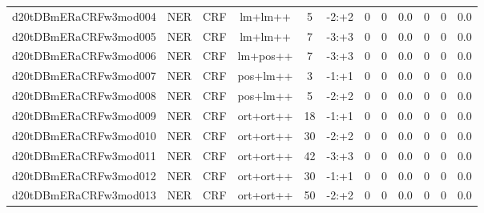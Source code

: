 \documentclass[a4paper]{article}
\begin{document}
\begin{landscape}
\begin{center}
\begin{tabular}{ |c|c|c|c|c|c|c|c|c|c|c|c|}
 
 	
 	\small{ d20tDBmERaCRFw3mod004 } & \small{ NER} & \small{  CRF }  & lm+lm++  &  5 &  \small{  -2:+2 }  &  0 & 0 & 0.0  &  0 & 0 & 0.0 \\
 	

 
 	
 	\small{ d20tDBmERaCRFw3mod005 } & \small{ NER} & \small{  CRF }  & lm+lm++  &  7 &  \small{  -3:+3 }  &  0 & 0 & 0.0  &  0 & 0 & 0.0 \\
 	

 
 	
 	\small{ d20tDBmERaCRFw3mod006 } & \small{ NER} & \small{  CRF }  & lm+pos++  &  7 &  \small{  -3:+3 }  &  0 & 0 & 0.0  &  0 & 0 & 0.0 \\
 	

 
 	
 	\small{ d20tDBmERaCRFw3mod007 } & \small{ NER} & \small{  CRF }  & pos+lm++  &  3 &  \small{  -1:+1 }  &  0 & 0 & 0.0  &  0 & 0 & 0.0 \\
 	

 
 	
 	\small{ d20tDBmERaCRFw3mod008 } & \small{ NER} & \small{  CRF }  & pos+lm++  &  5 &  \small{  -2:+2 }  &  0 & 0 & 0.0  &  0 & 0 & 0.0 \\
 	

 
 	
 	\small{ d20tDBmERaCRFw3mod009 } & \small{ NER} & \small{  CRF }  & ort+ort++  &  18 &  \small{  -1:+1 }  &  0 & 0 & 0.0  &  0 & 0 & 0.0 \\
 	

 
 	
 	\small{ d20tDBmERaCRFw3mod010 } & \small{ NER} & \small{  CRF }  & ort+ort++  &  30 &  \small{  -2:+2 }  &  0 & 0 & 0.0  &  0 & 0 & 0.0 \\
 	

 
 	
 	\small{ d20tDBmERaCRFw3mod011 } & \small{ NER} & \small{  CRF }  & ort+ort++  &  42 &  \small{  -3:+3 }  &  0 & 0 & 0.0  &  0 & 0 & 0.0 \\
 	

 
 	
 	\small{ d20tDBmERaCRFw3mod012 } & \small{ NER} & \small{  CRF }  & ort+ort++  &  30 &  \small{  -1:+1 }  &  0 & 0 & 0.0  &  0 & 0 & 0.0 \\
 	

 
 	
 	\small{ d20tDBmERaCRFw3mod013 } & \small{ NER} & \small{  CRF }  & ort+ort++  &  50 &  \small{  -2:+2 }  &  0 & 0 & 0.0  &  0 & 0 & 0.0 \\
 	


\end{tabular}
\end{center}
\end{landscape}
\end{document}
